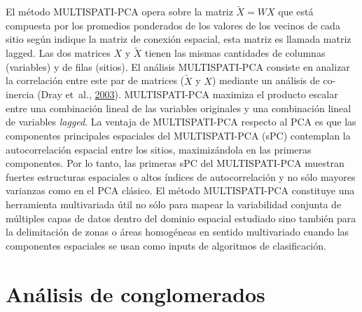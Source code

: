 \documentclass[11pt,b5paper,]{krantz}
\begin{document}
El método MULTISPATI-PCA opera sobre la matriz \(\widetilde{X}=WX\) que está compuesta por los promedios ponderados de los valores de los vecinos de cada sitio según indique la matriz de conexión espacial, esta matriz es llamada matriz lagged. Las dos matrices \(X\) y \(\widetilde{X}\) tienen las mismas cantidades de columnas (variables) y de filas (sitios). El análisis MULTISPATI-PCA consiste en analizar la correlación entre este par de matrices (\(\widetilde{X}\) y \(X\)) mediante un análisis de co-inercia (Dray et~al., \protect\hyperlink{ref-Dray_Chessel_Thioulouse_2003}{2003}). MULTISPATI-PCA maximiza el producto escalar entre una combinación lineal de las variables originales y una combinación lineal de variables \emph{lagged}. La ventaja de MULTISPATI-PCA respecto al PCA es que las componentes principales espaciales del MULTISPATI-PCA (sPC) contemplan la autocorrelación espacial entre los sitios, maximizándola en las primeras componentes. Por lo tanto, las primeras sPC del MULTISPATI-PCA muestran fuertes estructuras espaciales o altos índices de autocorrelación y no sólo mayores varianzas como en el PCA clásico. El método MULTISPATI-PCA constituye una herramienta multivariada útil no sólo para mapear la variabilidad conjunta de múltiples capas de datos dentro del dominio espacial estudiado sino también para la delimitación de zonas o áreas homogéneas en sentido multivariado cuando las componentes espaciales se usan como inputs de algoritmos de clasificación.

\hypertarget{anuxe1lisis-de-conglomerados}{%
\section{Análisis de conglomerados}\label{anuxe1lisis-de-conglomerados}}
\end{document}
